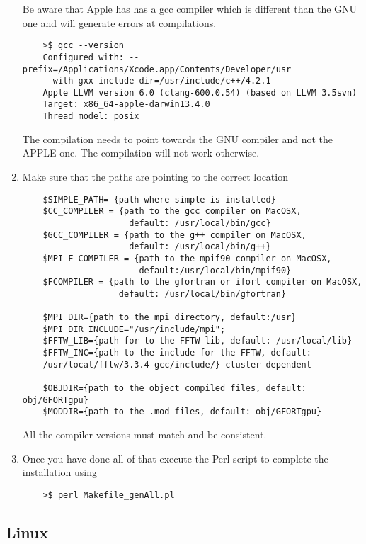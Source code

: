 \documentclass[review]{elsarticle}
\begin{document}
\begin{enumerate}
Be aware that Apple has has a gcc compiler which is different
than the GNU one and will generate errors at compilations.

\begin{verbatim}
    >$ gcc --version 
    Configured with: --prefix=/Applications/Xcode.app/Contents/Developer/usr
    --with-gxx-include-dir=/usr/include/c++/4.2.1
    Apple LLVM version 6.0 (clang-600.0.54) (based on LLVM 3.5svn)
    Target: x86_64-apple-darwin13.4.0
    Thread model: posix
\end{verbatim}

The compilation needs to point towards the GNU compiler and not the
APPLE one. The compilation will not work otherwise.

\item \label{paths} Make sure that the paths are pointing to the
  correct location

\begin{verbatim}
    $SIMPLE_PATH= {path where simple is installed}
    $CC_COMPILER = {path to the gcc compiler on MacOSX,
                     default: /usr/local/bin/gcc}
    $GCC_COMPILER = {path to the g++ compiler on MacOSX,
                     default: /usr/local/bin/g++}
    $MPI_F_COMPILER = {path to the mpif90 compiler on MacOSX, 
                       default:/usr/local/bin/mpif90}
    $FCOMPILER = {path to the gfortran or ifort compiler on MacOSX,
                   default: /usr/local/bin/gfortran}

    $MPI_DIR={path to the mpi directory, default:/usr}
    $MPI_DIR_INCLUDE="/usr/include/mpi";
    $FFTW_LIB={path for to the FFTW lib, default: /usr/local/lib}
    $FFTW_INC={path to the include for the FFTW, default:
    /usr/local/fftw/3.3.4-gcc/include/} cluster dependent

    $OBJDIR={path to the object compiled files, default: obj/GFORTgpu}
    $MODDIR={path to the .mod files, default: obj/GFORTgpu}
\end{verbatim}
All the compiler versions must match and be consistent.

\item \label{perl} Once you have done all of that execute the Perl
  script to complete the installation using
\begin{verbatim}
    >$ perl Makefile_genAll.pl
\end{verbatim}

\end{enumerate}

\subsection{Linux}
\label{inst_linux}
\end{document}
